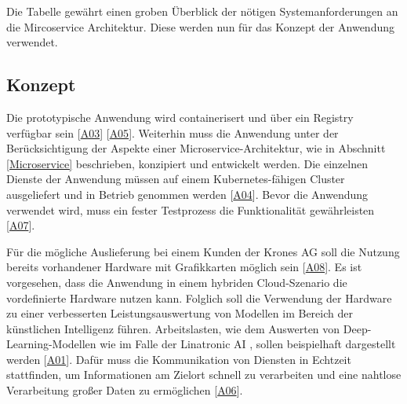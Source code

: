 Die Tabelle gewährt einen groben Überblick der nötigen Systemanforderungen an die Mircoservice Architektur. 
Diese werden nun für das Konzept der Anwendung verwendet.









\subsection{Konzept}
Die prototypische Anwendung wird containerisert und über ein Registry verfügbar sein [\hyperlink{A03}{A03}] [\hyperlink{A05}{A05}]. 
Weiterhin muss die Anwendung unter der Berücksichtigung der Aspekte einer Microservice-Architektur, wie in Abschnitt \ref{Microservice} beschrieben, konzipiert und entwickelt werden. 
Die einzelnen Dienste der Anwendung müssen auf einem Kubernetes-fähigen Cluster ausgeliefert und in Betrieb genommen werden [\hyperlink{A04}{A04}].
Bevor die Anwendung verwendet wird, muss ein fester Testprozess die Funktionalität gewährleisten [\hyperlink{A07}{A07}].

Für die mögliche Auslieferung bei einem Kunden der Krones AG soll die Nutzung bereits vorhandener Hardware mit Grafikkarten möglich sein [\hyperlink{A08}{A08}]. 
Es ist vorgesehen, dass die Anwendung in einem hybriden Cloud-Szenario die vordefinierte Hardware nutzen kann. Folglich soll die Verwendung der Hardware zu einer verbesserten Leistungsauswertung von Modellen im Bereich der künstlichen Intelligenz führen. 
Arbeitslasten, wie dem Auswerten von Deep-Learning-Modellen wie im Falle der Linatronic AI \cite{linatronic}, sollen beispielhaft dargestellt werden [\hyperlink{A01}{A01}]. 
Dafür muss die Kommunikation von Diensten in Echtzeit stattfinden, um Informationen am Zielort schnell zu verarbeiten und eine nahtlose Verarbeitung großer Daten zu ermöglichen [\hyperlink{A06}{A06}].

